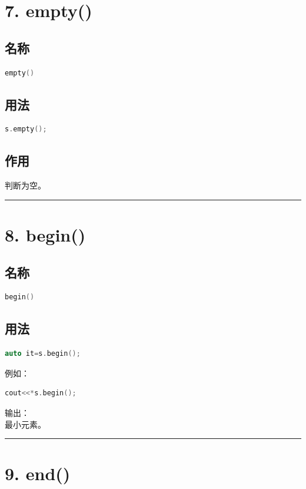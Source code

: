 \documentclass[9pt,twocolumn]{extarticle}
\begin{document}
\section{7. empty()}

\subsection{名称}
\begin{lstlisting}[language=C++]
empty()
\end{lstlisting}

\subsection{用法}
\begin{lstlisting}[language=C++]
s.empty();
\end{lstlisting}

\subsection{作用}
判断为空。

\noindent\rule{\linewidth}{0.4pt}

\section{8. begin()}

\subsection{名称}
\begin{lstlisting}[language=C++]
begin()
\end{lstlisting}

\subsection{用法}
\begin{lstlisting}[language=C++]
auto it=s.begin();
\end{lstlisting}
例如：
\begin{lstlisting}[language=C++]
cout<<*s.begin();
\end{lstlisting}
输出：\\
最小元素。

\noindent\rule{\linewidth}{0.4pt}

\section{9. end()}
\end{document}
